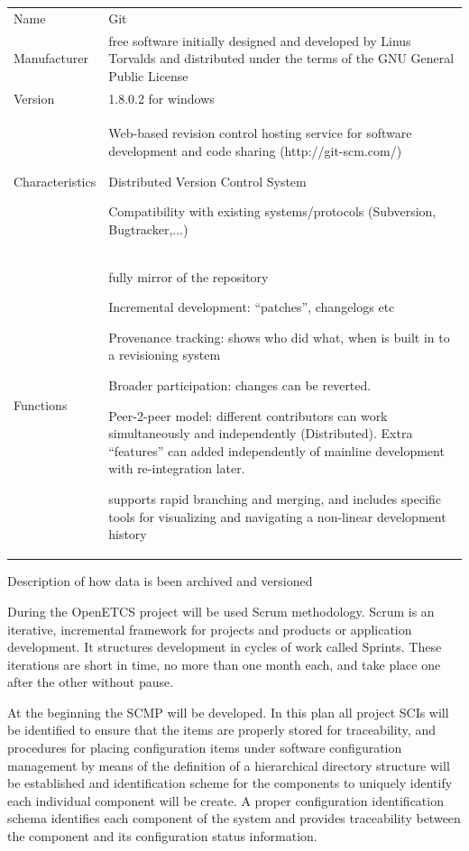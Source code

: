 \documentclass{template/openetcs_article}
\begin{document}
\begin{flushleft}

\begin{tabular}{|m{3cm}|m{11cm}|}
\hline
\rowcolor{myblue}
\multicolumn{2}{|c|}{CMS Tool} \\\hline
Name &
Git \\\hline
Manufacturer &
free software initially designed and developed by Linus Torvalds and distributed under the terms of the GNU General Public License\\\hline
Version &
1.8.0.2 for windows\\\hline
Characteristics &
Web-based revision control hosting service for software development and code sharing (http://git-scm.com/)

Distributed Version Control System

Compatibility with existing systems/protocols (Subversion, Bugtracker,...)\\\hline
Functions &
fully mirror of the repository

Incremental development: ``patches'', changelogs etc

Provenance tracking: shows who did what, when is built in to a revisioning system

Broader participation: changes can be reverted.

Peer-2-peer model: different contributors can work simultaneously and independently (Distributed). Extra ``features'' can added independently of mainline development with re-integration later. 

supports rapid branching and merging, and includes specific tools for visualizing and navigating a non-linear development history\\\hline
\end{tabular}
\end{flushleft}


Description of how data is been archived and versioned

During the OpenETCS project will be used Scrum methodology. Scrum is an iterative, incremental framework for projects and products or application development. It structures development in cycles of work called Sprints. These iterations are short in time, no more than one month each, and take place one after the other without pause. 

At the beginning the SCMP will be developed. In this plan all project SCIs will be identified to ensure that the items are properly stored for traceability, and procedures for placing configuration items under software configuration management by means of the definition of a hierarchical directory structure will be established and identification scheme for the components to uniquely identify each individual component will be create. A proper configuration identification schema identifies each component of the system and provides traceability between the component and its configuration status information.
\end{document}
